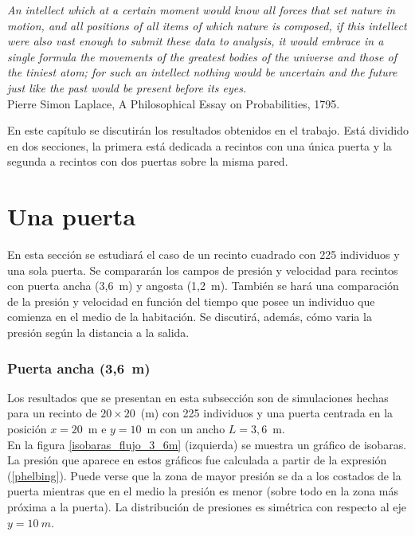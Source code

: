 \label{resultados}

\begin{flushleft}
 {\footnotesize{ \textsl {An intellect which at a certain moment would know all forces that set nature in motion, and all positions of all items of which nature is composed, if this intellect were also vast enough to submit these data to analysis, it would embrace in a single formula the movements of the greatest bodies of the universe and those of the tiniest atom; for such an intellect nothing would be uncertain and the future just like the past would be present before its eyes.}}} \\
\footnotesize  Pierre Simon Laplace, A Philosophical Essay on Probabilities, 1795.\\
\end{flushleft}

En este capítulo se discutirán los resultados obtenidos en el trabajo. Está dividido en dos secciones, la primera está dedicada a recintos con una única puerta y la segunda a recintos con dos puertas sobre la misma pared.  

\section{\label{una_puerta} Una puerta}

En esta sección se estudiará el caso de un recinto cuadrado con 225 individuos y una sola puerta. Se compararán los campos de presión y velocidad para recintos con puerta ancha (3,6~m) y angosta (1,2~m). También se hará una comparación de la presión y velocidad en función del tiempo que posee un individuo que comienza en el medio de la habitación. Se discutirá, además, cómo varia la presión según la distancia a la salida.     

\subsubsection{Puerta ancha (3,6~m)}

Los resultados que se presentan en esta subsección son de simulaciones hechas para un recinto de  $20\times 20$~(m) con 225 individuos y una puerta centrada en la posición $x=20$~m e $y=10$~m con un ancho $L=3,6$~m.\\

En la figura \ref{isobaras_flujo_3_6m} (izquierda) se muestra un gráfico de isobaras. La presión que aparece en estos gráficos fue calculada a partir de la expresión (\ref{phelbing}). Puede verse que la zona de mayor presión se da a los costados de la puerta mientras que en el medio la presión es menor (sobre todo en la zona más próxima a la puerta). La distribución de presiones es simétrica con respecto al eje $y=10~m$.  

